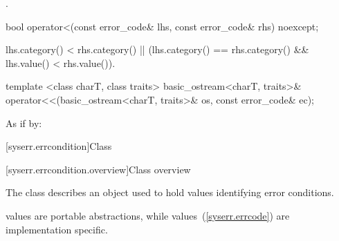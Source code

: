\begin{itemdescr}
\pnum
\returns {}.
\end{itemdescr}

%
\begin{itemdecl}
bool operator<(const error_code& lhs, const error_code& rhs) noexcept;
\end{itemdecl}

\begin{itemdescr}
\pnum
\returns
\begin{codeblock}
lhs.category() < rhs.category() ||
(lhs.category() == rhs.category() && lhs.value() < rhs.value()).
\end{codeblock}
\end{itemdescr}

%
\begin{itemdecl}
template <class charT, class traits>
  basic_ostream<charT, traits>&
    operator<<(basic_ostream<charT, traits>& os, const error_code& ec);
\end{itemdecl}

\begin{itemdescr}
\pnum
\effects
As if by: 
\end{itemdescr}


[syserr.errcondition]{Class }

[syserr.errcondition.overview]{Class  overview}

\pnum
The class  describes an object used to hold values identifying
error conditions. \begin{note}  values are portable abstractions,
while  values~(\ref{syserr.errcode}) are implementation specific. \end{note}

